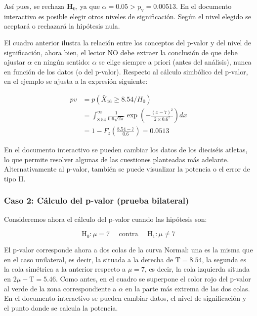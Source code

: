 \documentclass[
]{article}
\begin{document}
Así pues, se rechaza \(\mathbf{H}_{0}\), ya que \(\alpha=0.05>\mathrm{p}_{\mathrm{v}}=0.00513\). En el documento interactivo es posible elegir otros niveles de significación. Según el nivel elegido se aceptará o rechazará la hipótesis nula.

El cuadro anterior ilustra la relación entre los conceptos del p-valor y del nivel de significación, ahora bien, el lector NO debe extraer la conclusión de que debe ajustar \(\alpha\) en ningún sentido: \(\alpha\) se elige siempre a priori (antes del análisis), nunca en función de los datos (o del p-valor). Respecto al cálculo simbólico del p-valor, en el ejemplo se ajusta a la expresión siguiente:

\[
\begin{aligned}
p v & =p\left(\bar{X}_{16} \geq 8.54 / H_{0}\right) \\
& =\int_{8.54}^{\infty} \frac{1}{0.6 \sqrt{2 \pi}} \exp \left(-\frac{(x-7)^{2}}{2 \times 0.6^{2}}\right) d x \\
& =1-F_{z}\left(\frac{8.54-7}{0.6}\right)=0.0513
\end{aligned}
\]

En el documento interactivo se pueden cambiar los datos de los dieciséis atletas, lo que permite resolver algunas de las cuestiones planteadas más adelante. Alternativamente al p-valor, también se puede visualizar la potencia o el error de tipo II.

\subsubsection{Caso 2: Cálculo del p-valor (prueba bilateral)}\label{caso-2-cuxe1lculo-del-p-valor-prueba-bilateral}

Consideremos ahora el cálculo del p-valor cuando las hipótesis son:

\[
\mathrm{H}_{0}: \mu=7 \quad \text { contra } \quad \mathrm{H}_{1}: \mu \neq 7
\]

El p-valor corresponde ahora a dos colas de la curva Normal: una es la misma que en el caso unilateral, es decir, la situada a la derecha de \(\mathrm{T}=8.54\), la segunda es la cola simétrica a la anterior respecto a \(\mu=7\), es decir, la cola izquierda situada en \(2 \mu-\mathrm{T}=5.46\). Como antes, en el cuadro se superpone el color rojo del p-valor al verde de la zona correspondiente a \(\alpha\) en la parte más extrema de las dos colas. En el documento interactivo se pueden cambiar datos, el nivel de significación y el punto donde se calcula la potencia.
\end{document}
